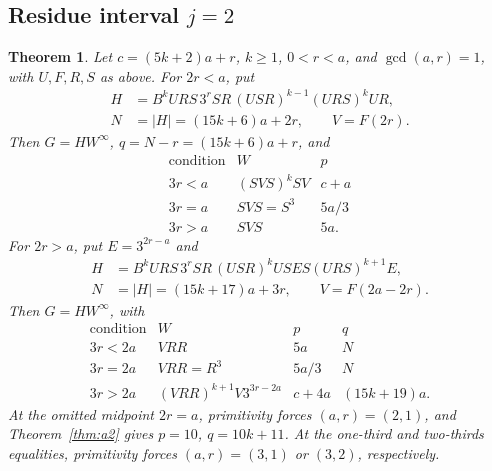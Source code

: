 \documentclass[11pt]{article}
\newtheorem{theorem}{Theorem}[section]
\theoremstyle{remark}\newtheorem{remark}[theorem]{Remark}
\newcommand{\per}{^{\infty}}
\begin{document}
\subsection{Residue interval \texorpdfstring{$j=2$}{j=2}}
\begin{theorem}\label{thm:second}
Let $c=(5k+2)a+r$, $k\ge1$, $0<r<a$, and $\gcd(a,r)=1$, with $U,F,R,S$ as above. For $2r<a$, put
\begin{align*}
H&=B^kURS\,3^rSR\,(USR)^{k-1}(URS)^kUR,\\
N&=|H|=(15k+6)a+2r,\qquad V=F(2r).
\end{align*}
Then $G=HW\per$, $q=N-r=(15k+6)a+r$, and
\[
\begin{array}{c|c|c}
\text{condition}&W&p\\\hline
3r<a&(SVS)^kSV&c+a\\
3r=a&SVS=S^3&5a/3\\
3r>a&SVS&5a.
\end{array}
\]
For $2r>a$, put $E=3^{2r-a}$ and
\begin{align*}
H&=B^kURS\,3^rSR\,(USR)^kUSE S(URS)^{k+1}E,\\
N&=|H|=(15k+17)a+3r,\qquad V=F(2a-2r).
\end{align*}
Then $G=HW\per$, with
\[
\begin{array}{c|c|c|c}
\text{condition}&W&p&q\\\hline
3r<2a&VRR&5a&N\\
3r=2a&VRR=R^3&5a/3&N\\
3r>2a&(VRR)^{k+1}V3^{3r-2a}&c+4a&(15k+19)a.
\end{array}
\]
At the omitted midpoint $2r=a$, primitivity forces $(a,r)=(2,1)$, and Theorem~\ref{thm:a2} gives $p=10$, $q=10k+11$. At the one-third and two-thirds equalities, primitivity forces $(a,r)=(3,1)$ or $(3,2)$, respectively.
\end{theorem}
\end{document}
